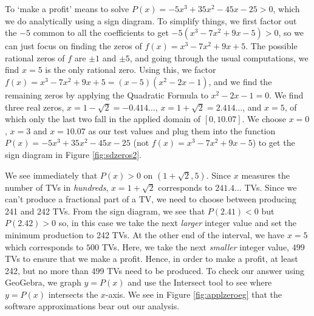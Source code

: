 {To `make a profit' means to solve $P(x) = -5x^3+35x^2-45x-25 > 0$, which we do analytically using a sign diagram.  To simplify things, we first factor out the $-5$ common to all the coefficients to get $-5\left(x^3 - 7x^2+9x-5\right) > 0$, so we can just focus on finding the zeros of $f(x) = x^3-7x^2+9x+5$.  The possible rational zeros of $f$ are $\pm 1$ and $\pm 5$, and going through the usual computations, we find $x=5$ is the only rational zero.  Using this, we factor $f(x) = x^3-7x^2+9x+5 = (x-5) \left(x^2-2x-1\right)$, and we find the remaining zeros by applying the Quadratic Formula to $x^2-2x-1 = 0$.  We find three real zeros,  $x=1-\sqrt{2} = -0.414 \ldots$,  $x = 1+\sqrt{2} = 2.414 \ldots$, and $x = 5$, of which only the last two fall in the applied domain of $[0, 10.07]$.  We choose $x=0$, $x=3$ and $x=10.07$ as our test values and plug them into the function $P(x)=-5x^3+35x^2-45x-25$ (not $f(x) =x^3 - 7x^2+9x-5$) to get the sign diagram in Figure \ref{fig:sdzeros2}.



We see immediately that $P(x)>0$ on $(1+\sqrt{2},5)$.  Since $x$ measures the number of TVs in \textit{hundreds}, $x = 1 + \sqrt{2}$ corresponds to $241.4\ldots$ TVs.  Since we can't produce a fractional part of a TV, we need to choose between producing 241 and 242 TVs.  From the sign diagram, we see that $P(2.41) < 0$ but $P(2.42)>0$ so, in this case we take the next \textit{larger} integer value and set the minimum production to 242 TVs.  At the other end of the interval, we have $x=5$ which corresponds to $500$ TVs.  Here, we take the next \textit{smaller} integer value, $499$ TVs to ensure that we make a profit.  Hence, in order to make a profit, at least 242, but no more than 499 TVs need to be produced.  To check our answer using GeoGebra, we graph $y=P(x)$ and use the Intersect tool to see where $y=P(x)$ intersects the $x$-axis. We see in Figure \ref{fig:applzeroeg} that the software approximations bear out our analysis.
}



